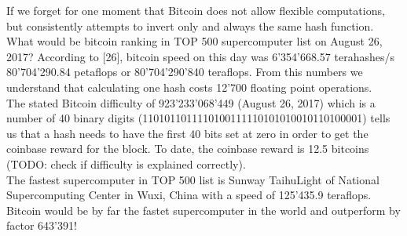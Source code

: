 If we forget for one moment that Bitcoin does not allow flexible computations, but consistently attempts to invert only and always the same hash function. What would be bitcoin ranking in TOP 500 supercomputer list on August 26, 2017? According to [26], bitcoin speed on this day was 6'354'668.57 terahashes/s 80'704'290.84 petaflops or 80'704'290'840 teraflops. From this numbers we understand that calculating one hash costs 12'700 floating point operations. \\

The stated Bitcoin difficulty of 923'233'068'449 (August 26, 2017) which is a number of 40 binary digits (1101011011110100111110101010010110100001) tells us that a hash needs to have the first 40 bits set at zero in order to get the coinbase reward for the block. To date, the coinbase reward is 12.5 bitcoins (TODO: check if difficulty is explained correctly).\\

The fastest supercomputer in TOP 500 list is Sunway TaihuLight of National Supercomputing Center in Wuxi, China with a speed of 125'435.9 teraflops. Bitcoin would be by far the fastet supercomputer in the world and outperform by factor 643'391!
